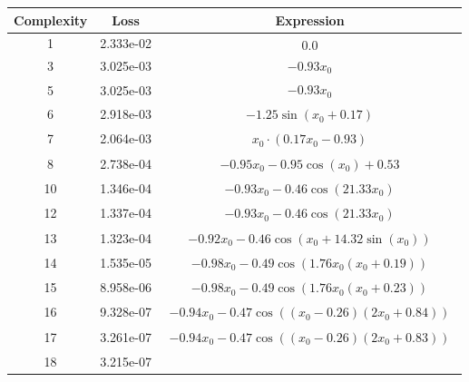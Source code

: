 \begin{center}
        \begin{tabular}{|c|c|c|}
        \hline
        Complexity & Loss & Expression \\
        \hline
        1 & 2.333e-02 & $\begin{aligned}0.0\end{aligned}$\\ \hline3 & 3.025e-03 & $\begin{aligned}- 0.93 x_{0}\end{aligned}$\\ \hline5 & 3.025e-03 & $\begin{aligned}- 0.93 x_{0}\end{aligned}$\\ \hline6 & 2.918e-03 & $\begin{aligned}- 1.25 \sin{\left(x_{0} + 0.17 \right)}\end{aligned}$\\ \hline7 & 2.064e-03 & $\begin{aligned}x_{0} \cdot \left(0.17 x_{0} - 0.93\right)\end{aligned}$\\ \hline8 & 2.738e-04 & $\begin{aligned}- 0.95 x_{0} - 0.95 \cos{\left(x_{0} \right)} + 0.53\end{aligned}$\\ \hline10 & 1.346e-04 & $\begin{aligned}- 0.93 x_{0} - 0.46 \cos{\left(21.33 x_{0} \right)}\end{aligned}$\\ \hline12 & 1.337e-04 & $\begin{aligned}- 0.93 x_{0} - 0.46 \cos{\left(21.33 x_{0} \right)}\end{aligned}$\\ \hline13 & 1.323e-04 & $\begin{aligned}- 0.92 x_{0} - 0.46 \cos{\left(x_{0} + 14.32 \sin{\left(x_{0} \right)} \right)}\end{aligned}$\\ \hline14 & 1.535e-05 & $\begin{aligned}- 0.98 x_{0} - 0.49 \cos{\left(1.76 x_{0} \left(x_{0} + 0.19\right) \right)}\end{aligned}$\\ \hline15 & 8.958e-06 & $\begin{aligned}- 0.98 x_{0} - 0.49 \cos{\left(1.76 x_{0} \left(x_{0} + 0.23\right) \right)}\end{aligned}$\\ \hline16 & 9.328e-07 & $\begin{aligned}- 0.94 x_{0} - 0.47 \cos{\left(\left(x_{0} - 0.26\right) \left(2 x_{0} + 0.84\right) \right)}\end{aligned}$\\ \hline17 & 3.261e-07 & $\begin{aligned}- 0.94 x_{0} - 0.47 \cos{\left(\left(x_{0} - 0.26\right) \left(2 x_{0} + 0.83\right) \right)}\end{aligned}$\\ \hline18 & 3.215e-07 & 
\end{tabular}
\end{center}
